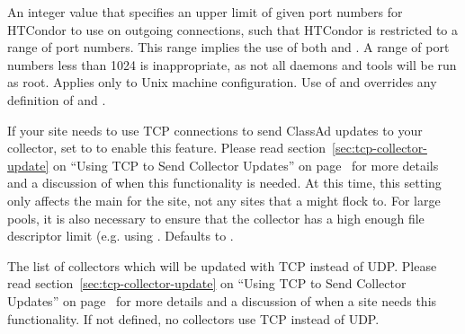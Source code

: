 \begin{description}
\label{param:OutHighPort}
\item[\Macro{OUT\_HIGHPORT}]
  An integer value that specifies an upper limit of given port numbers
  for HTCondor to use on outgoing connections,
  such that HTCondor is restricted to a range of port numbers.
  This range implies the use of both  and
  .
  A range of port numbers less than 1024 is inappropriate, as
  not all daemons and tools will be run as root.
  Applies only to Unix machine configuration.
  Use of  and  overrides
  any definition of  and .

\label{param:UpdateCollectorWithTcp}
\item[\Macro{UPDATE\_COLLECTOR\_WITH\_TCP}]
  If your site needs to use TCP connections to send ClassAd updates to
  your collector, set to 
  to enable this feature.
  Please read section~\ref{sec:tcp-collector-update} on ``Using TCP to
  Send Collector Updates'' on page~\pageref{sec:tcp-collector-update}
  for more details and a discussion of when this
  functionality is needed. 
  At this time, this setting only affects the main 
  for the site, not any sites that a  might flock to. 
  For large pools, it is also necessary to
  ensure that the collector has a high enough file descriptor limit
  (e.g. using .
  Defaults to .

\label{param:TcpUpdateCollectors}
\item[\Macro{TCP\_UPDATE\_COLLECTORS}]
  The list of collectors which will be updated with TCP instead of UDP.
  Please read section~\ref{sec:tcp-collector-update} on ``Using TCP to
  Send Collector Updates'' on page~\pageref{sec:tcp-collector-update}
  for more details and a discussion of when a site needs this
  functionality. 
  If not defined, no collectors use TCP instead of UDP.


\end{description}
